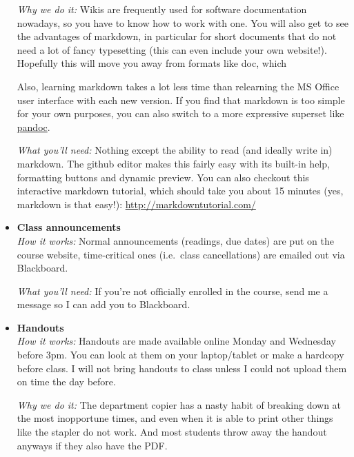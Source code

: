 \begin{itemize}
        \emph{Why we do it:}
        Wikis are frequently used for software documentation nowadays, so you have to know how to work with one.
        You will also get to see the advantages of markdown, in particular for short documents that do not need a lot of fancy typesetting (this can even include your own website!).
        Hopefully this will move you away from formats like doc, which
        Also, learning markdown takes a lot less time than relearning the MS Office user interface with each new version.
        If you find that markdown is too simple for your own purposes, you can also switch to a more expressive superset like \href{http://johnmacfarlane.net/pandoc/}{pandoc}.

        \emph{What you'll need:}
        Nothing except the ability to read (and ideally write in) markdown.
        The github editor makes this fairly easy with its built-in help, formatting buttons and dynamic preview.
        You can also checkout this interactive markdown tutorial, which should take you about 15 minutes (yes, markdown is that easy!):
        \href{http://markdowntutorial.com/}{http://markdowntutorial.com/}

    \item \textbf{Class announcements}\\
        \emph{How it works:}
        Normal announcements (readings, due dates) are put on the course website, time-critical ones (i.e.\ class cancellations) are emailed out via Blackboard.
        
        \emph{What you'll need:}
        If you're not officially enrolled in the course, send me a message so I can add you to Blackboard.

    \item \textbf{Handouts}\\
        \emph{How it works:}
        Handouts are made available online Monday and Wednesday before 3pm.
        You can look at them on your laptop\slash tablet or make a hardcopy before class.
        I will not bring handouts to class unless I could not upload them on time the day before.

        \emph{Why we do it:}
        The department copier has a nasty habit of breaking down at the most inopportune times, and even when it is able to print other things like the stapler do not work.
        And most students throw away the handout anyways if they also have the PDF.
\end{itemize}
